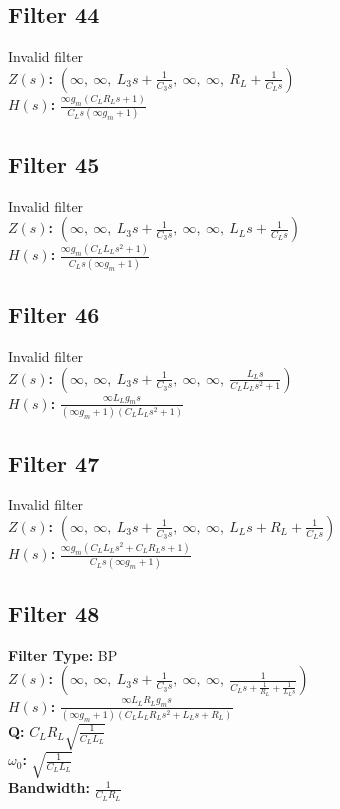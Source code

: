 \documentclass{article}
\begin{document}
\subsection*{Filter 44}
Invalid filter \\ 
\textbf{$Z(s)$:} $\left( \infty, \  \infty, \  L_{3} s + \frac{1}{C_{3} s}, \  \infty, \  \infty, \  R_{L} + \frac{1}{C_{L} s}\right)$ \\ 
\textbf{$H(s)$:} $\frac{\infty g_{m} \left(C_{L} R_{L} s + 1\right)}{C_{L} s \left(\infty g_{m} + 1\right)}$ \\ 
\subsection*{Filter 45}
Invalid filter \\ 
\textbf{$Z(s)$:} $\left( \infty, \  \infty, \  L_{3} s + \frac{1}{C_{3} s}, \  \infty, \  \infty, \  L_{L} s + \frac{1}{C_{L} s}\right)$ \\ 
\textbf{$H(s)$:} $\frac{\infty g_{m} \left(C_{L} L_{L} s^{2} + 1\right)}{C_{L} s \left(\infty g_{m} + 1\right)}$ \\ 
\subsection*{Filter 46}
Invalid filter \\ 
\textbf{$Z(s)$:} $\left( \infty, \  \infty, \  L_{3} s + \frac{1}{C_{3} s}, \  \infty, \  \infty, \  \frac{L_{L} s}{C_{L} L_{L} s^{2} + 1}\right)$ \\ 
\textbf{$H(s)$:} $\frac{\infty L_{L} g_{m} s}{\left(\infty g_{m} + 1\right) \left(C_{L} L_{L} s^{2} + 1\right)}$ \\ 
\subsection*{Filter 47}
Invalid filter \\ 
\textbf{$Z(s)$:} $\left( \infty, \  \infty, \  L_{3} s + \frac{1}{C_{3} s}, \  \infty, \  \infty, \  L_{L} s + R_{L} + \frac{1}{C_{L} s}\right)$ \\ 
\textbf{$H(s)$:} $\frac{\infty g_{m} \left(C_{L} L_{L} s^{2} + C_{L} R_{L} s + 1\right)}{C_{L} s \left(\infty g_{m} + 1\right)}$ \\ 
\subsection*{Filter 48}
\textbf{Filter Type:} BP \\ 
\textbf{$Z(s)$:} $\left( \infty, \  \infty, \  L_{3} s + \frac{1}{C_{3} s}, \  \infty, \  \infty, \  \frac{1}{C_{L} s + \frac{1}{R_{L}} + \frac{1}{L_{L} s}}\right)$ \\ 
\textbf{$H(s)$:} $\frac{\infty L_{L} R_{L} g_{m} s}{\left(\infty g_{m} + 1\right) \left(C_{L} L_{L} R_{L} s^{2} + L_{L} s + R_{L}\right)}$ \\ 
\textbf{Q:} $C_{L} R_{L} \sqrt{\frac{1}{C_{L} L_{L}}}$ \\ 
\textbf{$\omega_0$:} $\sqrt{\frac{1}{C_{L} L_{L}}}$ \\ 
\textbf{Bandwidth:} $\frac{1}{C_{L} R_{L}}$ \\ 
\end{document}
